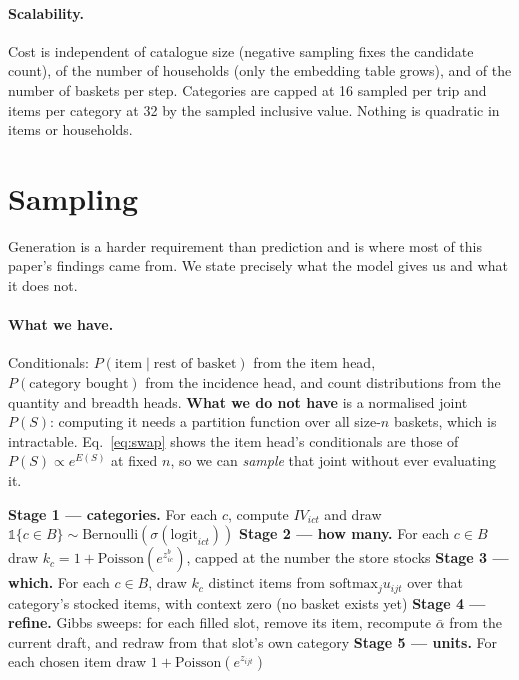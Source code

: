 \documentclass[11pt]{article}
\begin{document}
\paragraph{Scalability.} Cost is independent of catalogue size (negative sampling fixes
the candidate count), of the number of households (only the embedding table grows), and
of the number of baskets per step. Categories are capped at 16 sampled per trip and
items per category at 32 by the sampled inclusive value. Nothing is quadratic in
items or households.

\section{Sampling}
\label{sec:sampling}

Generation is a harder requirement than prediction and is where most of this paper's
findings came from. We state precisely what the model gives us and what it does not.

\paragraph{What we have.} Conditionals: $P(\text{item}\mid\text{rest of basket})$ from the
item head, $P(\text{category bought})$ from the incidence head, and count distributions
from the quantity and breadth heads. \textbf{What we do not have} is a normalised joint
$P(S)$: computing it needs a partition function over all size-$n$ baskets, which is
intractable. Eq.~\ref{eq:swap} shows the item head's conditionals are those of
$P(S)\propto e^{E(S)}$ at fixed $n$, so we can \emph{sample} that joint without ever
evaluating it.

\begin{algorithm}[h]
\SetAlgoLined
{}
\textbf{Stage 1 --- categories.} For each $c$, compute $IV_{ict}$ and draw
$\mathbb 1\{c\in B\}\sim\mathrm{Bernoulli}(\sigma(\mathrm{logit}_{ict}))$\;
\textbf{Stage 2 --- how many.} For each $c\in B$ draw
$k_c=1+\mathrm{Poisson}(e^{z^b_{ic}})$, capped at the number the store stocks\;
\textbf{Stage 3 --- which.} For each $c\in B$, draw $k_c$ distinct items from
$\mathrm{softmax}_j u_{ijt}$ over that category's stocked items, with context zero (no
basket exists yet)\;
\textbf{Stage 4 --- refine.} Gibbs sweeps: for each filled slot, remove its item,
recompute $\bar\alpha$ from the current draft, and redraw from that slot's own category\;
\textbf{Stage 5 --- units.} For each chosen item draw $1+\mathrm{Poisson}(e^{z_{ijt}})$\;
\caption{Basket generation}
\end{algorithm}
\end{document}
